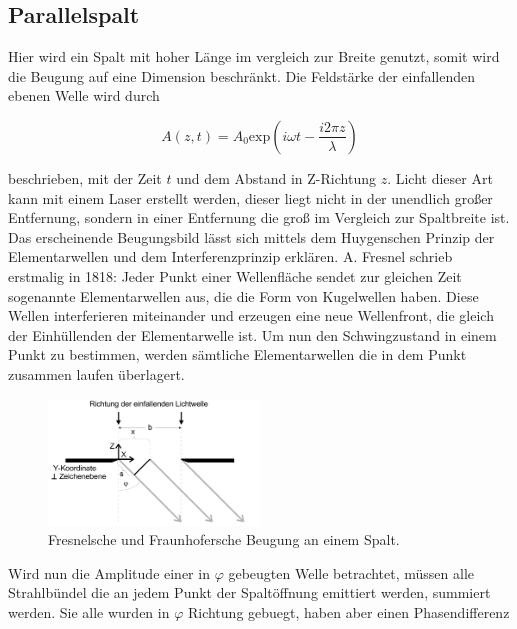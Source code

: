     \subsection{Parallelspalt}

        \noindent Hier wird ein Spalt mit hoher Länge im vergleich zur Breite genutzt, somit wird die Beugung auf eine Dimension beschränkt.
        Die Feldstärke der einfallenden ebenen Welle wird durch 

        \begin{equation*}
            A(z,t) = A_0 \text{exp}\left(i \omega t - \frac{i 2\pi z}{\lambda}\right)
        \end{equation*}

        \noindent beschrieben, mit der Zeit $t$ und dem Abstand in Z-Richtung $z$. Licht dieser Art kann mit einem Laser erstellt werden, 
        dieser liegt nicht in der unendlich großer Entfernung, sondern in einer Entfernung die groß im Vergleich zur Spaltbreite ist. 
        Das erscheinende Beugungsbild lässt sich mittels dem Huygenschen Prinzip der Elementarwellen und dem Interferenzprinzip 
        erklären. A. Fresnel schrieb erstmalig in 1818: Jeder Punkt einer Wellenfläche sendet zur gleichen Zeit sogenannte Elementarwellen aus, 
        die die Form von Kugelwellen haben. Diese Wellen interferieren miteinander und erzeugen eine neue Wellenfront, die gleich der Einhüllenden
        der Elementarwelle ist. Um nun den Schwingzustand in einem Punkt zu bestimmen, werden sämtliche Elementarwellen die in dem Punkt zusammen 
        laufen überlagert.

        \begin{figure}[ht]
            \centering
            \includegraphics[width=0.5\textwidth]{latex/images/einzel.PNG}
            \caption{Fresnelsche und Fraunhofersche Beugung an einem Spalt\protect \cite{V406}.}
            \label{img:einzel}
        \end{figure}

        \noindent Wird nun die Amplitude einer in $\varphi$ gebeugten Welle betrachtet, müssen alle Strahlbündel die an jedem Punkt der 
        Spaltöffnung emittiert werden, summiert werden. Sie alle wurden in $\varphi$ Richtung gebuegt, haben aber einen Phasendifferenz 

